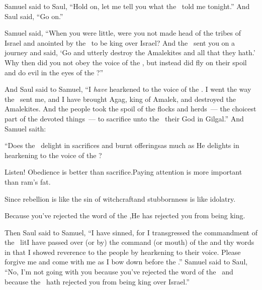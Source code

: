 \begin{inparaenum}
   Samuel said to Saul, ``Hold on, let me tell you what the \lord\ told me tonight.'' And Saul said, ``Go on.''%
  
   Samuel said, ``When you were little, were you not made head of the tribes of Israel and anointed by the \lord\ to be king over Israel?%
   And the \lord\ sent you on a journey and said, `Go and utterly destroy the Amalekites and all that they hath.'%
   Why then did you not obey the voice of the \lord, but instead did fly on their spoil and do evil in the eyes of the \lord?''%
  
   And Saul said to Samuel, ``I \emph{have} hearkened to the voice of the \lord. I went the way the \lord\ sent me, and I have brought Agag, king of Amalek, and destroyed the Amalekites.%
   And the people took the spoil of the flocks and herds~--- the choicest part of the devoted things~--- to sacrifice unto the \lord\ their God in Gilgal.''%
   And Samuel saith:%
  
  \pb ``Does the \lord\ delight in sacrifices and burnt offerings\pa as much as He delights in hearkening to the voice of the \lord?%
  
  \pb Listen! Obedience is better than sacrifice.\pa Paying attention is more important than ram's fat.%
  
  \pa {} Since rebellion is like the sin of witchcraft\pa and stubbornness is like idolatry.%
  
  \pb Because you've rejected the word of the \lord,\pa He has rejected you from being king.%
  
   Then Saul said to Samuel, ``I have sinned, for I transgressed the commandment of the \lord\ lit{I have passed over (or by) the command (or mouth) of the \lord} and thy words in that I showed reverence to the people by hearkening to their voice.%
   Please forgive me and come with me as I bow down before the \lord.''%
   Samuel said to Saul, ``No, I'm not going with you because you've rejected the word of the \lord\ and because the \lord\ hath rejected you from being king over Israel.''%
  

\end{inparaenum}
